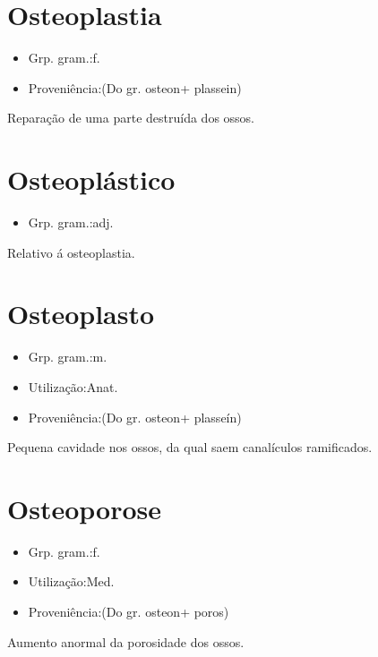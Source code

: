\section{Osteoplastia}
\begin{itemize}
\item {Grp. gram.:f.}
\end{itemize}
\begin{itemize}
\item {Proveniência:(Do gr. \textunderscore osteon\textunderscore  + \textunderscore plassein\textunderscore )}
\end{itemize}
Reparação de uma parte destruída dos ossos.
\section{Osteoplástico}
\begin{itemize}
\item {Grp. gram.:adj.}
\end{itemize}
Relativo á osteoplastia.
\section{Osteoplasto}
\begin{itemize}
\item {Grp. gram.:m.}
\end{itemize}
\begin{itemize}
\item {Utilização:Anat.}
\end{itemize}
\begin{itemize}
\item {Proveniência:(Do gr. \textunderscore osteon\textunderscore  + \textunderscore plasseín\textunderscore )}
\end{itemize}
Pequena cavidade nos ossos, da qual saem canalículos ramificados.
\section{Osteoporose}
\begin{itemize}
\item {Grp. gram.:f.}
\end{itemize}
\begin{itemize}
\item {Utilização:Med.}
\end{itemize}
\begin{itemize}
\item {Proveniência:(Do gr. \textunderscore osteon\textunderscore  + \textunderscore poros\textunderscore )}
\end{itemize}
Aumento anormal da porosidade dos ossos.
